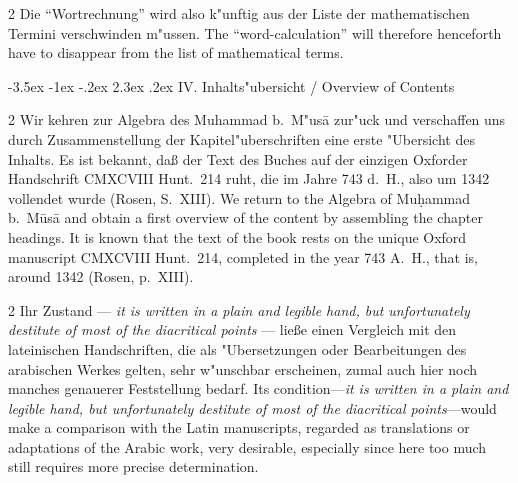 \documentclass[10pt,a4paper]{article}
\makeatletter
\renewcommand{\switchcolumn}{\syncronize\nointerlineskip\columnbreak}
\renewcommand{\section}{\@startsection{section}{1}{\z@}%
  {-3.5ex \@plus -1ex \@minus -.2ex}%
  {2.3ex \@plus .2ex}%
  {\normalfont\Large\bfseries\color{sectioncolor}}}
\newcommand{\enquote}[1]{``#1''}
\makeatother
\begin{document}
\begin{paracol}{2}
Die \enquote{Wortrechnung} wird also k"unftig aus der Liste der mathematischen Termini verschwinden m"ussen.
\switchcolumn
The ``word-calculation'' will therefore henceforth have to disappear from the list of mathematical terms.
\end{paracol}
\clearpage


\section{IV. Inhalts"ubersicht / Overview of Contents}

\begin{paracol}{2}
Wir kehren zur Algebra des Muhammad b.\ M"us\=a zur"uck und verschaffen uns durch Zusammenstellung der Kapitel"uberschriften eine erste "Ubersicht des Inhalts. Es ist bekannt, da\ss{} der Text des Buches auf der einzigen Oxforder Handschrift CMXCVIII Hunt.\ 214 ruht, die im Jahre 743 d.\ H., also um 1342 vollendet wurde (Rosen, S.\ XIII).
\switchcolumn
We return to the Algebra of Mu\d{h}ammad b.\ M\=us\=a and obtain a first overview of the content by assembling the chapter headings. It is known that the text of the book rests on the unique Oxford manuscript CMXCVIII Hunt.\ 214, completed in the year 743 A.\ H., that is, around 1342 (Rosen, p.\ XIII).
\end{paracol}

\begin{paracol}{2}
Ihr Zustand --- \textit{it is written in a plain and legible hand, but unfortunately destitute of most of the diacritical points} --- lie\ss{}e einen Vergleich mit den lateinischen Handschriften, die als "Ubersetzungen oder Bearbeitungen des arabischen Werkes gelten, sehr w"unschbar erscheinen, zumal auch hier noch manches genauerer Feststellung bedarf.
\switchcolumn
Its condition---\textit{it is written in a plain and legible hand, but unfortunately destitute of most of the diacritical points}---would make a comparison with the Latin manuscripts, regarded as translations or adaptations of the Arabic work, very desirable, especially since here too much still requires more precise determination.
\end{paracol}
\end{document}
